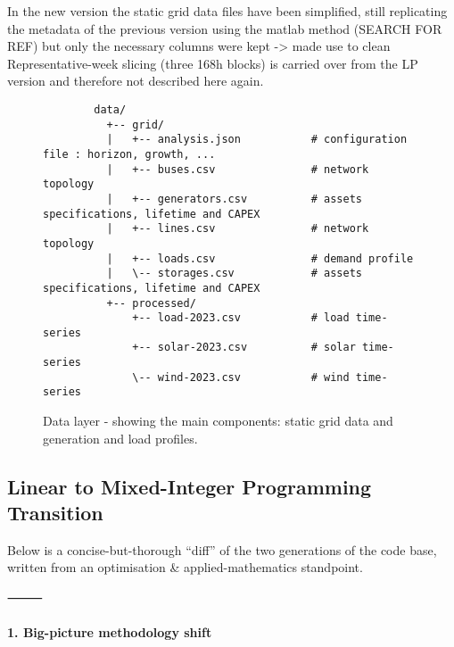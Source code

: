 In the new version the static grid data files have been simplified, still replicating the
metadata of the previous version using the matlab method (SEARCH FOR REF) but only the necessary 
columns were kept -> made use to clean 
Representative-week slicing (three 168h blocks) is carried over from the LP version and therefore not
described here again.

\begin{figure}[h!]
  \centering
    \begin{verbatim}
        data/         
          +-- grid/                       
          |   +-- analysis.json           # configuration file : horizon, growth, ...
          |   +-- buses.csv               # network topology
          |   +-- generators.csv          # assets specifications, lifetime and CAPEX
          |   +-- lines.csv               # network topology
          |   +-- loads.csv               # demand profile
          |   \-- storages.csv            # assets specifications, lifetime and CAPEX
          +-- processed/                  
              +-- load-2023.csv           # load time-series
              +-- solar-2023.csv          # solar time-series
              \-- wind-2023.csv           # wind time-series
    \end{verbatim}
  \caption{Data layer - showing the main components: static grid data and generation and load profiles.}
  \label{fig:data-layer}
\end{figure}

\subsection{Linear to Mixed-Integer Programming Transition}
\label{sec:milp-upgrade}

Below is a concise-but-thorough “diff” of the two generations of the code base, written from an optimisation \& applied-mathematics standpoint.

⸻

\paragraph{1. Big-picture methodology shift}


